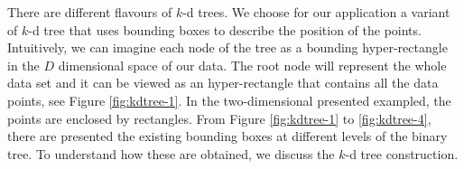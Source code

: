 There are different flavours of $k$-d trees. We choose for our application a
variant of $k$-d tree that uses bounding boxes to describe the position of the
points. Intuitively, we can imagine each node of the tree as a bounding
hyper-rectangle in the $D$ dimensional space of our data. The root node will
represent the whole data set and it can be viewed as an hyper-rectangle that
contains all the data points, see Figure \ref{fig:kdtree-1}. In the two-dimensional presented exampled, the points are enclosed by rectangles. From Figure \ref{fig:kdtree-1} to \ref{fig:kdtree-4}, there are presented the existing bounding boxes at different levels of the binary tree. To understand how these are obtained, we discuss the $k$-d tree construction.

\begin{figure}
  \centering
\\

\end{figure}
